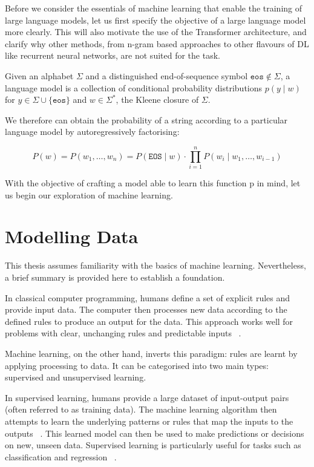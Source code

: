 \documentclass[a4paper, oneside]{discothesis}
\begin{document}
Before we consider the essentials of machine learning that enable the training of large language models, let us first specify the objective of a large language model more clearly. 
This will also motivate the use of the Transformer architecture, and clarify why other methods, from n-gram based approaches to other flavours of DL like recurrent neural networks, are not suited for the task.

\begin{theorem} \label{thm:first theorem}
    Given an alphabet $\Sigma$ and a distinguished end-of-sequence symbol $\texttt{eos} \notin \Sigma$, a
    language model is a collection of conditional probability distributions $p(y \mid w)$ for $y \in \Sigma \cup \{\texttt{eos}\}$ and $w \in \Sigma^*$,
    the Kleene closure of $\Sigma$.
\end{theorem}

We therefore can obtain the probability of a string according to a particular language model by autoregressively factorising:

\begin{equation}
    P(w) = P(w_1, \ldots, w_n) =  P(\texttt{EOS} \mid w) \cdot \prod_{i=1}^n P(w_i \mid w_1, \ldots, w_{i-1}) 
\end{equation}

With the objective of crafting a model able to learn this function p in mind, let us begin our exploration of machine learning. 

\section{Modelling Data}

This thesis assumes familiarity with the basics of machine learning. Nevertheless, a brief summary is provided here to establish a foundation.

In classical computer programming, humans define a set of explicit rules and provide input data. The computer then processes new data according to the defined rules to produce an output for the data. This approach works well for problems with clear, unchanging rules and predictable inputs ~\cite{russell2010artificial}.

Machine learning, on the other hand, inverts this paradigm: rules are learnt by applying processing to data. It can be categorised into two main types: supervised and unsupervised learning.

In supervised learning, humans provide a large dataset of input-output pairs (often referred to as training data). 
The machine learning algorithm then attempts to learn the underlying patterns or rules that map the inputs to the outputs ~\cite{hastie01statisticallearning}. 
This learned model can then be used to make predictions or decisions on new, unseen data.
Supervised learning is particularly useful for tasks such as classification and regression ~\cite{bishop2006pattern}.
\end{document}
